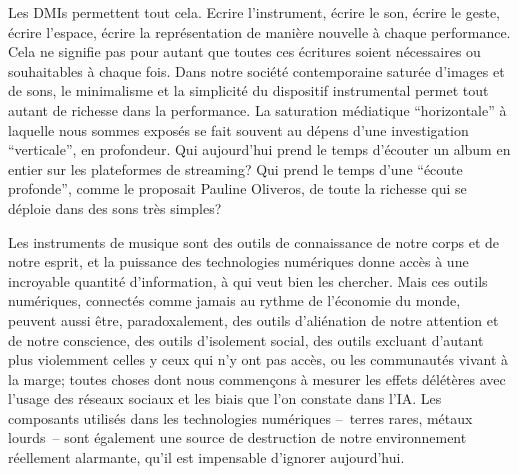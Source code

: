 Les \glspl{DMI} permettent tout cela. Ecrire l'instrument, écrire le son, écrire le geste, écrire l'espace, écrire la représentation de manière nouvelle à chaque performance. Cela ne signifie pas pour autant que toutes ces écritures soient nécessaires ou souhaitables à chaque fois. Dans notre société contemporaine saturée d'images et de sons, le minimalisme et la simplicité du dispositif instrumental permet tout autant de richesse dans la performance. La saturation médiatique ``horizontale'' à laquelle nous sommes exposés se fait souvent au dépens d'une investigation ``verticale'', en profondeur. 
Qui aujourd'hui prend le temps d'écouter un album en entier sur les plateformes de streaming? Qui prend le temps d'une ``écoute profonde'', comme le proposait Pauline Oliveros, de toute la richesse qui se déploie dans des sons très simples?

Les instruments de musique sont des outils de connaissance de notre corps et de notre esprit, et la puissance des technologies numériques donne accès à une incroyable quantité d'information, à qui veut bien les chercher. Mais ces outils numériques, connectés comme jamais au rythme de l'économie du monde, peuvent aussi être, paradoxalement, des outils d'aliénation de notre attention et de notre conscience, des outils d'isolement social, des outils excluant d'autant plus violemment celles y ceux qui n'y ont pas accès, ou les communautés vivant à la marge; toutes choses dont nous commençons à mesurer les effets délétères avec l'usage des réseaux sociaux et les biais que l'on constate dans l'IA. Les composants utilisés dans les technologies numériques --~terres rares, métaux lourds~-- sont également une source de destruction de notre environnement réellement alarmante, qu'il est impensable d'ignorer aujourd'hui.



